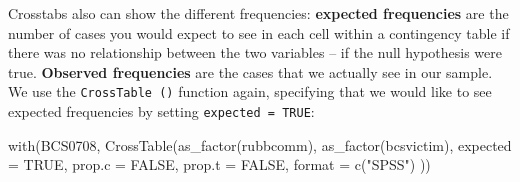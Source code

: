 \documentclass[
]{book}
\newenvironment{Shaded}{\begin{snugshade}}{\end{snugshade}}
\newcommand{\AttributeTok}[1]{\textcolor[rgb]{0.77,0.63,0.00}{#1}}
\newcommand{\ConstantTok}[1]{\textcolor[rgb]{0.00,0.00,0.00}{#1}}
\newcommand{\FunctionTok}[1]{\textcolor[rgb]{0.00,0.00,0.00}{#1}}
\newcommand{\NormalTok}[1]{#1}
\newcommand{\StringTok}[1]{\textcolor[rgb]{0.31,0.60,0.02}{#1}}
\begin{document}
Crosstabs also can show the different frequencies: \textbf{expected frequencies} are the number of cases you would expect to see in each cell within a contingency table if there was no relationship between the two variables -- if the null hypothesis were true. \textbf{Observed frequencies} are the cases that we actually see in our sample. We use the \texttt{CrossTable\ ()} function again, specifying that we would like to see expected frequencies by setting \texttt{expected\ =\ TRUE}:

\begin{Shaded}
\begin{Highlighting}[]
\FunctionTok{with}\NormalTok{(BCS0708, }\FunctionTok{CrossTable}\NormalTok{(}\FunctionTok{as\_factor}\NormalTok{(rubbcomm), }
                         \FunctionTok{as\_factor}\NormalTok{(bcsvictim), }
                         \AttributeTok{expected =} \ConstantTok{TRUE}\NormalTok{, }\AttributeTok{prop.c =} \ConstantTok{FALSE}\NormalTok{, }\AttributeTok{prop.t =} \ConstantTok{FALSE}\NormalTok{, }\AttributeTok{format =}
                           \FunctionTok{c}\NormalTok{(}\StringTok{"SPSS"}\NormalTok{) ))}
\end{Highlighting}
\end{Shaded}
\end{document}
